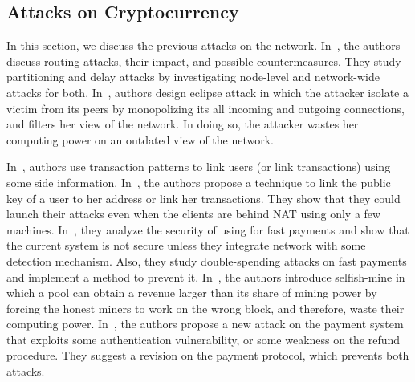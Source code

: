  

  \subsection{Attacks on \bc Cryptocurrency}
 In this section, we discuss the previous attacks on the \bc network. 
 In~\cite{hijack}, the authors discuss routing attacks, their impact, and possible countermeasures. They study partitioning and delay attacks by investigating node-level and network-wide attacks for both. 
In~\cite{eclipse}, authors design eclipse attack in which the attacker isolate a victim from its peers by monopolizing its all incoming and outgoing connections, and filters her view of the network. In doing so, the attacker wastes her computing power on an outdated view of the network.

In~\cite{analysis_anon,privacy_anon,struct,fist,quant}, authors use \bc transaction patterns
to link users (or link transactions) using some side information.
In~\cite{deanom1}, the authors propose a technique to link the public key of a user to her address or link her transactions. They show that they could launch their attacks even when the clients are behind NAT using only a few machines.
 In~\cite{double}, they analyze the security of using \bc for fast payments and show that the current \bc system is not secure unless they integrate \bc network with some detection mechanism.
 Also, they study double-spending attacks on fast payments and implement a method to prevent it.
 In~\cite{majority}, the authors introduce selfish-mine in which a pool can obtain a revenue larger than its share of mining power by forcing the honest miners to work on the wrong block, and therefore, waste their computing power.
In~\cite{refund}, the authors propose a new attack on the \bc payment system that exploits some authentication vulnerability, or some weakness on the refund procedure. They suggest a revision on the \bc payment protocol, which prevents both attacks.

